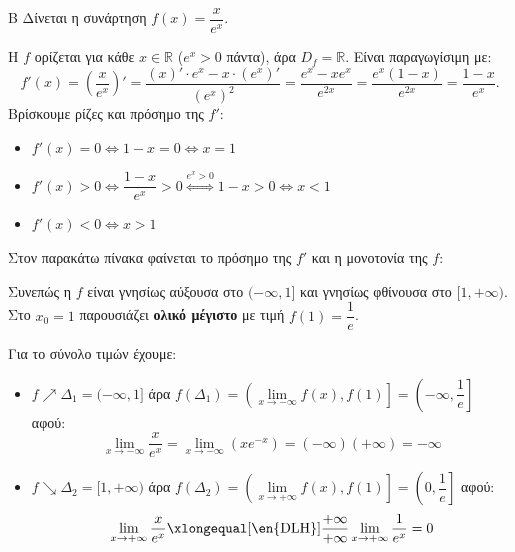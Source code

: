 \begin{thema}{Β}
Δίνεται η συνάρτηση $f(x)=\dfrac{x}{e^x}$.

\begin{erwthma}

\item Η $f$ ορίζεται για κάθε $x\in\mathbb{R}$ ($e^x>0$ πάντα), άρα $D_f=\mathbb{R}$.
Είναι παραγωγίσιμη με:
\[
f'(x)=\left(\frac{x}{e^x}\right)'=\frac{(x)'\cdot e^x-x\cdot(e^x)'}{(e^x)^2}
=\frac{e^x-xe^x}{e^{2x}}=\frac{e^x(1-x)}{e^{2x}}=\frac{1-x}{e^x}.
\]
Βρίσκουμε ρίζες και πρόσημο της $f'$:
\begin{itemize}
    \item $f'(x)=0\Leftrightarrow 1-x=0\Leftrightarrow x=1$
    \item $f'(x)>0\Leftrightarrow \dfrac{1-x}{e^x}>0\stackrel{e^x>0}{\Leftrightarrow}1-x>0\Leftrightarrow x<1$
    \item $f'(x)<0\Leftrightarrow x>1$
\end{itemize}
Στον παρακάτω πίνακα φαίνεται το πρόσημο της $f'$ και η μονοτονία της $f$:
\begin{center}
\end{center}
Συνεπώς η $f$ είναι γνησίως αύξουσα στο $(-\infty,1]$ και γνησίως φθίνουσα στο $[1,+\infty)$.
Στο $x_0=1$ παρουσιάζει \textbf{ολικό μέγιστο} με τιμή $f(1)=\dfrac{1}{e}$.

Για το σύνολο τιμών έχουμε:
\begin{itemize}
\item $f\nearrow\varDelta_1=(-\infty,1]$ άρα $f(\varDelta_1)=\left(\lim\limits_{x\to -\infty}{f(x)},f(1)\right]=\left(-\infty,\dfrac{1}{e}\right]$ αφού:
\[\lim\limits_{x\to-\infty}\dfrac{x}{e^x}=\lim\limits_{x\to -\infty}{\left(xe^{-x}\right)}=(-\infty)(+\infty)=-\infty\] 
\item $f\searrow\varDelta_2=[1,+\infty)$ άρα $f(\varDelta_2)=\left(\lim\limits_{x\to +\infty}{f(x)},f(1)\right]=\left(0,\dfrac{1}{e}\right]$ αφού:
\[ \lim\limits_{x\to+\infty}\dfrac{x}{e^x}\xlongequal[\text{\en{DLH}}]{\frac{+\infty}{+\infty}}\lim\limits_{x\to +\infty}{\dfrac{1}{e^x}}=0\]
\end{itemize}


\end{erwthma}
\end{thema}
